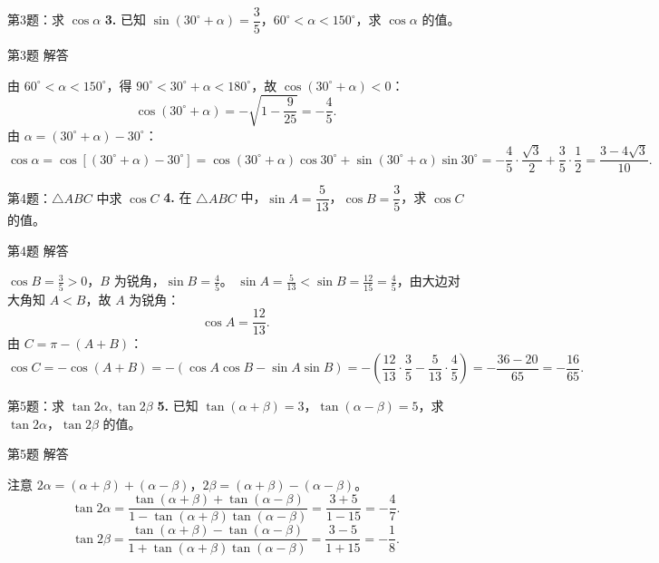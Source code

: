 \documentclass[10pt,aspectratio=169,serif]{beamer}
\begin{document}
\begin{frame}[t]{第3题：求 $\cos\alpha$}
\textbf{3.} 已知 $\sin(30^\circ+\alpha)=\dfrac35$，$60^\circ<\alpha<150^\circ$，求 $\cos\alpha$ 的值。
\end{frame}

\begin{frame}[t]{第3题 解答}
\begin{tcolorbox}[colback=orange!10,colframe=orange,title=\textbf{解}]
由 $60^\circ<\alpha<150^\circ$，得 $90^\circ<30^\circ+\alpha<180^\circ$，故 $\cos(30^\circ+\alpha)<0$：
\[
\cos(30^\circ+\alpha)=-\sqrt{1-\frac9{25}}=-\frac45.
\]
由 $\alpha=(30^\circ+\alpha)-30^\circ$：
\[
\cos\alpha=\cos[(30^\circ+\alpha)-30^\circ]
=\cos(30^\circ+\alpha)\cos30^\circ+\sin(30^\circ+\alpha)\sin30^\circ
=-\frac45\cdot\frac{\sqrt3}{2}+\frac35\cdot\frac12=\frac{3-4\sqrt3}{10}.
\]
\end{tcolorbox}
\end{frame}

\begin{frame}[t]{第4题：$\triangle ABC$ 中求 $\cos C$}
\textbf{4.} 在 $\triangle ABC$ 中，$\sin A=\dfrac5{13}$，$\cos B=\dfrac35$，求 $\cos C$ 的值。
\end{frame}

\begin{frame}[t]{第4题 解答}
\begin{tcolorbox}[colback=orange!10,colframe=orange,title=\textbf{解}]
$\cos B=\frac35>0$，$B$ 为锐角，$\sin B=\frac45$。
$\sin A=\frac5{13}<\sin B=\frac{12}{15}=\frac45$，由大边对大角知 $A<B$，故 $A$ 为锐角：
\[
\cos A=\frac{12}{13}.
\]
由 $C=\pi-(A+B)$：
\[
\cos C=-\cos(A+B)=-(\cos A\cos B-\sin A\sin B)
=-\!\left(\frac{12}{13}\cdot\frac35-\frac5{13}\cdot\frac45\right)
=-\frac{36-20}{65}=-\frac{16}{65}.
\]
\end{tcolorbox}
\end{frame}

\begin{frame}[t]{第5题：求 $\tan 2\alpha,\tan 2\beta$}
\textbf{5.} 已知 $\tan(\alpha+\beta)=3$，$\tan(\alpha-\beta)=5$，求 $\tan 2\alpha$，$\tan 2\beta$ 的值。
\end{frame}

\begin{frame}[t]{第5题 解答}
\begin{tcolorbox}[colback=orange!10,colframe=orange,title=\textbf{解}]
注意 $2\alpha=(\alpha+\beta)+(\alpha-\beta)$，$2\beta=(\alpha+\beta)-(\alpha-\beta)$。
\[
\tan 2\alpha=\frac{\tan(\alpha+\beta)+\tan(\alpha-\beta)}{1-\tan(\alpha+\beta)\tan(\alpha-\beta)}
=\frac{3+5}{1-15}=-\frac47.
\]
\[
\tan 2\beta=\frac{\tan(\alpha+\beta)-\tan(\alpha-\beta)}{1+\tan(\alpha+\beta)\tan(\alpha-\beta)}
=\frac{3-5}{1+15}=-\frac18.
\]
\end{tcolorbox}
\end{frame}
\end{document}
